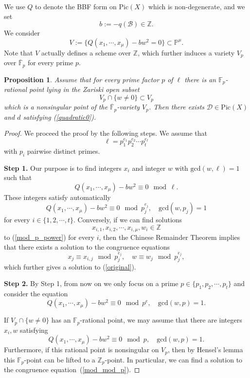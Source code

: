 \documentclass[11pt]{amsart}
\theoremstyle{plain}
\newtheorem{prop}[thm]{Proposition}
\theoremstyle{definition}
\theoremstyle{remark}
\newcommand{\BF}{{\mathbb{F}}}
\newcommand{\BP}{{\mathbb{P}}}
\newcommand{\BZ}{{\mathbb{Z}}}
\newcommand{\CB}{{\mathcal B}}
\newcommand{\CD}{{\mathcal D}}
\begin{document}
We use $Q$ to denote the BBF form on $\mathrm{Pic}(X)$ which is non-degenerate, and we set
\[
b:= -q(\CB) \in \BZ. 
\]
We consider 
\[
V:=\{ Q(x_1, \cdots, x_\mu)  - bw^2=0\} \subset \BP^\mu.
\]
Note that $V$ actually defines a scheme over $\BZ$, which further induces a variety $V_p$ over $\overline{\BF}_p$ for every prime $p$.

\begin{prop}\label{prop3.1}
Assume that for every prime factor $p$ of $\ell$ there is an $\BF_p$-rational point lying in the Zariski open subset
\[
V_p \cap \{w \neq 0\}  \subset V_p
\]
which is a nonsingular point of the $\overline{\BF}_p$-variety $V_p$. Then there exists $\CD \in \mathrm{Pic}(X)$ and $d$ satisfying (\ref{quadratic0}).
\end{prop}

\begin{proof}
    We proceed the proof by the following steps. We assume that 
    \[
    \ell = p_1^{e_1}p_2^{e_2}\cdots p_t^{e_t}
    \]
    with $p_i$ pairwise distinct primes.
    
\medskip
{\bf \noindent Step 1.} Our purpose is to find integers $x_i$ and integer $w$ with $\mathrm{gcd}(w,\ell)=1$ such that
\begin{equation}\label{original}
Q(x_1, \cdots, x_\mu)  - bw^2 \equiv 0 \mod \ell.
\end{equation}
These integers satisfy automatically
\begin{equation}\label{mod_p_power}
Q(x_1, \cdots, x_\mu)  - bw^2 \equiv 0 \mod p_j^{e_j}, \quad \mathrm{gcd}(w,p_j)=1
\end{equation}
for every $i \in \{1,2,\cdots,t\}$. Conversely, if we can find solutions 
\[
x_{i,1}, x_{i,2}, \cdots, x_{i,\mu}, w_i \in \BZ
\]
to (\ref{mod_p_power}) for every $i$, then the Chinese Remainder Theorem implies that there exists a solution to the congruence equations
\[
x_j \equiv x_{i,j} \mod  p_j^{e_j}, \quad w \equiv w_j \mod p_j^{e_j},
\]
which further gives a solution to (\ref{original}).

\medskip

{\bf \noindent Step 2.} By Step 1, from now on we only focus on a prime $p\in \{p_1, p_2, \cdots, p_t\}$ and consider the equation
\begin{equation}\label{mod_mod_p}
Q(x_1, \cdots, x_\mu)  - bw^2\equiv 0 \mod p^{e}, \quad \mathrm{gcd}(w,p)=1.
\end{equation}

If $V_p \cap \{w \neq 0\}$ has an $\BF_p$-rational point, we may assume that there are integers $x_i,w$ satisfying 
\[
Q(x_1, \cdots, x_\mu)  - bw^2 \equiv 0 \mod p, \quad \mathrm{gcd}(w,p)=1.
\]
Furthermore, if this rational point is nonsingular on $V_p$, then by Hensel's lemma this $\BF_p$-point can be lifted to a $\BZ_p$-point. In particular, we can find a solution to the congruence equation~(\ref{mod_mod_p}).
\end{proof}
\end{document}
